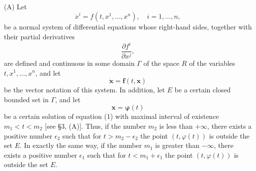 \documentclass[10pt,a5paper]{book}
\theoremstyle{plain}
\theoremstyle{definition}
\theoremstyle{remark}
\begin{document}
(A) Let
\[
\dot{x}^{i}=f\left(t, x^{1}, \ldots, x^{n}\right), \quad i=1, \ldots, n,
\]
be a normal system of differential equations whose right-hand sides, together with their partial derivatives
\[
\frac{\partial f^{i}}{\partial x^{j}},
\]
are defined and continuous in some domain $\Gamma$ of the space $R$ of the variables $t, x^{1}, \ldots, x^{n}$, and let
\begin{equation*}
\dot{\mathbf{x}}=\mathbf{f}(t, \mathbf{x}) \tag{1}
\end{equation*}
be the vector notation of this system. In addition, let $E$ be a certain closed bounded set in $\Gamma$, and let
\begin{equation*}
\mathbf{x}=\boldsymbol{\varphi}(t) \tag{2}
\end{equation*}
be a certain solution of equation (1) with maximal interval of existence $m_{1}<t<m_{2}$ [see §3, (A)]. Thus, if the number $m_{2}$ is less than $+\infty$, there exists a positive number $\epsilon_{2}$ such that for $t>m_{2}-\epsilon_{2}$ the point $(t, \varphi(t))$ is outside the set $E$. In exactly the same way, if the number $m_{1}$ is greater than $-\infty$, there exists a positive number $\epsilon_{1}$ such that for $t<m_{1}+\epsilon_{1}$ the point $(t, \varphi(t))$ is outside the set $E$.
\end{document}

